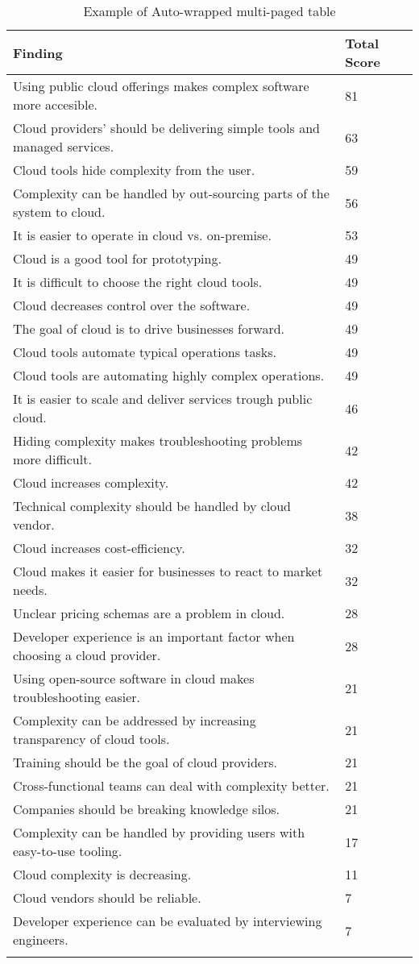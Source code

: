 
\renewcommand\arraystretch{1.5}%
\begin{longtable}{|p{10cm}|p{2cm}|}
\hline
\textbf{Finding}  & \textbf{Total Score} \\ \hline
\endhead
Using public cloud offerings makes complex software more accesible. & 81 \\ \hline
Cloud providers' should be delivering simple tools and managed services. & 63 \\ \hline
Cloud tools hide complexity from the user. & 59 \\ \hline
Complexity can be handled by out-sourcing parts of the system to cloud. & 56 \\ \hline
It is easier to operate in cloud vs. on-premise. & 53 \\ \hline
Cloud is a good tool for prototyping. & 49 \\ \hline
It is difficult to choose the right cloud tools. & 49 \\ \hline
Cloud decreases control over the software. & 49 \\ \hline
The goal of cloud is to drive businesses forward. & 49 \\ \hline
Cloud tools automate typical operations tasks. & 49 \\ \hline
Cloud tools are automating highly complex operations. & 49 \\ \hline
It is easier to scale and deliver services trough public cloud. & 46 \\ \hline
Hiding complexity makes troubleshooting problems more difficult. & 42 \\ \hline
Cloud increases complexity. & 42 \\ \hline
Technical complexity should be handled by cloud vendor. & 38 \\ \hline
Cloud increases cost-efficiency. & 32 \\ \hline
Cloud makes it easier for businesses to react to market needs. & 32 \\ \hline
Unclear pricing schemas are a problem in cloud. & 28 \\ \hline
Developer experience is an important factor when choosing a cloud provider. & 28 \\ \hline
Using open-source software in cloud makes troubleshooting easier. & 21 \\ \hline
Complexity can be addressed by increasing transparency of cloud tools. & 21 \\ \hline
Training should be the goal of cloud providers. & 21 \\ \hline
Cross-functional teams can deal with complexity better. & 21 \\ \hline
Companies should be breaking knowledge silos. & 21 \\ \hline
Complexity can be handled by providing users with easy-to-use tooling. & 17 \\ \hline
Cloud complexity is decreasing. & 11 \\ \hline
Cloud vendors should be reliable. & 7 \\ \hline
Developer experience can be evaluated by interviewing engineers. & 7 \\ \hline
\caption{Example of Auto-wrapped multi-paged table}
\label{tab:table1}
\end{longtable}
